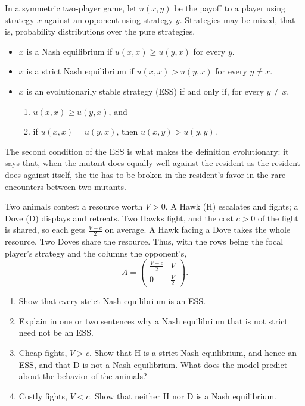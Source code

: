 \documentclass[a4paper,12pt]{article}
\begin{document}
In a symmetric two-player game, let $u(x,y)$ be the payoff to a player using strategy $x$ against an opponent using strategy $y$. Strategies may be mixed, that is, probability distributions over the pure strategies.
\begin{itemize}
\item $x$ is a Nash equilibrium if $u(x,x) \geq u(y,x)$ for every $y$.
\item $x$ is a strict Nash equilibrium if $u(x,x) > u(y,x)$ for every $y \neq x$.
\item $x$ is an evolutionarily stable strategy (ESS) if and only if, for every $y \neq x$,
	\begin{enumerate}[label=(\roman*)]
	\item $u(x,x) \geq u(y,x)$, and
	\item if $u(x,x) = u(y,x)$, then $u(x,y)>u(y,y)$.
	\end{enumerate}
\end{itemize}
The second condition of the ESS is what makes the definition evolutionary: it says that, when the mutant does equally well against the resident as the resident does against itself, the tie has to be broken in the resident's favor in the rare encounters between two mutants.

Two animals contest a resource worth $V>0$. A Hawk (H) escalates and fights; a Dove (D) displays and retreats. Two Hawks fight, and the cost $c>0$ of the fight is shared, so each gets $\frac{V-c}{2}$ on average. A Hawk facing a Dove takes the whole resource. Two Doves share the resource. Thus, with the rows being the focal player's strategy and the columns the opponent's,
\[ A = \begin{pmatrix} \frac{V-c}{2} & V \\[2pt] 0 & \frac{V}{2} \end{pmatrix} . \]

\begin{enumerate}[label=(\alph*)]
\item Show that every strict Nash equilibrium is an ESS.

\item Explain in one or two sentences why a Nash equilibrium that is not strict need not be an ESS.

\item Cheap fights, $V>c$. Show that H is a strict Nash equilibrium, and hence an ESS, and that D is not a Nash equilibrium. What does the model predict about the behavior of the animals?

\item Costly fights, $V<c$. Show that neither H nor D is a Nash equilibrium.

\end{enumerate}
\end{document}
